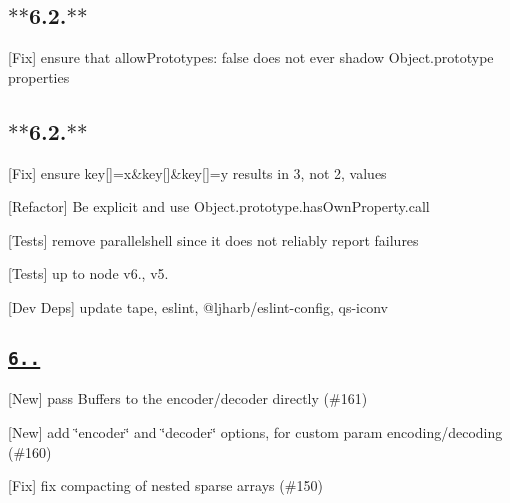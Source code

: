 \subsection*{$\ast$$\ast$6.2.$\ast$$\ast$}


\begin{DoxyItemize}
\item \mbox{[}Fix\mbox{]} ensure that {\ttfamily allow\+Prototypes\+: false} does not ever shadow Object.\+prototype properties
\end{DoxyItemize}

\subsection*{$\ast$$\ast$6.2.$\ast$$\ast$}


\begin{DoxyItemize}
\item \mbox{[}Fix\mbox{]} ensure {\ttfamily key\mbox{[}\mbox{]}=x\&key\mbox{[}\mbox{]}\&key\mbox{[}\mbox{]}=y} results in 3, not 2, values
\item \mbox{[}Refactor\mbox{]} Be explicit and use {\ttfamily Object.\+prototype.\+has\+Own\+Property.\+call}
\item \mbox{[}Tests\mbox{]} remove {\ttfamily parallelshell} since it does not reliably report failures
\item \mbox{[}Tests\mbox{]} up to {\ttfamily node} {\ttfamily v6.}, {\ttfamily v5.}
\item \mbox{[}Dev Deps\mbox{]} update {\ttfamily tape}, {\ttfamily eslint}, {\ttfamily @ljharb/eslint-\/config}, {\ttfamily qs-\/iconv}
\end{DoxyItemize}

\subsection*{\href{https://github.com/ljharb/qs/issues?milestone=36&state=closed}{\tt {\bfseries 6..}}}


\begin{DoxyItemize}
\item \mbox{[}New\mbox{]} pass Buffers to the encoder/decoder directly (\#161)
\item \mbox{[}New\mbox{]} add \char`\"{}encoder\char`\"{} and \char`\"{}decoder\char`\"{} options, for custom param encoding/decoding (\#160)
\item \mbox{[}Fix\mbox{]} fix compacting of nested sparse arrays (\#150)
\end{DoxyItemize}

